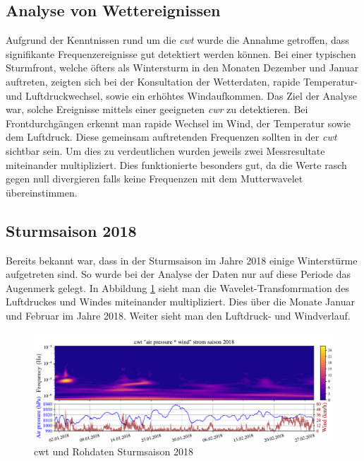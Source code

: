 \begin{refsection}
\section{Analyse von Wettereignissen}
Aufgrund der Kenntnissen rund um die \textit{cwt} wurde die Annahme getroffen, dass signifikante Frequenzereignisse gut detektiert werden können.
Bei einer typischen Sturmfront, welche öfters als Wintersturm in den Monaten Dezember und Januar auftreten, zeigten sich bei der Konsultation der Wetterdaten, rapide Temperatur- und Luftdruckwechsel, sowie ein erhöhtes Windaufkommen.
Das Ziel der Analyse war, solche Ereignisse mittels einer geeigneten \textit{cwr} zu detektieren.
Bei Frontdurchgängen erkennt man rapide Wechsel im Wind, der Temperatur sowie dem Luftdruck.
Diese gemeinsam auftretenden Frequenzen sollten in der \textit{cwt} sichtbar sein.
Um dies zu verdeutlichen wurden jeweils zwei Messresultate miteinander multipliziert.
Dies funktionierte besonders gut, da die Werte rasch gegen null divergieren falls keine Frequenzen mit dem Mutterwavelet übereinstimmen. 

\subsection{Sturmsaison 2018}
Bereits bekannt war, dass in der Sturmsaison im Jahre 2018 einige Winterstürme aufgetreten sind.
So wurde bei der Analyse der Daten nur auf diese Periode das Augenmerk gelegt. In Abbildung \ref{fig:cwt_storm} \space sieht man die Wavelet-Transfomrmation des Luftdruckes und Windes miteinander multipliziert. Dies über die Monate Januar und Februar im Jahre 2018. Weiter sieht man den Luftdruck- und Windverlauf.
 
\begin{figure}[]
	\centering
	\includegraphics[width=1\textwidth]{papers/wwt/images/storm_airp_wind.pdf}
	\caption{cwt und Rohdaten Sturmsaison 2018}
	\label{fig:cwt_storm}
\end{figure}


\end{refsection}
